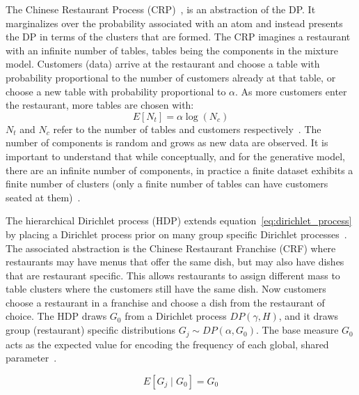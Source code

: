 The Chinese Restaurant Process (CRP)~\citep{neal2000markov, gershman2012tutorial}, is an abstraction of the DP. It marginalizes over the probability associated with an atom and instead presents the DP in terms of the clusters that are formed. The CRP imagines a restaurant with an infinite number of tables, tables being the components in the mixture model. Customers (data) arrive at the restaurant and choose a table with probability proportional to the number of customers already at that table, or choose a new table with probability proportional to $\alpha$. As more customers enter the restaurant, more tables are chosen with:
\begin{equation}
  E[N_t] = \alpha \log(N_c)
\end{equation}
$N_t$ and $N_c$ refer to the number of tables and customers respectively~\citep{gershman2012tutorial}. The number of components is random and grows as new data are observed. It is important to understand that while conceptually, and for the generative model, there are an infinite number of components, in practice a finite dataset exhibits a finite number of clusters (only a finite number of tables can have customers seated at them)~\citep{blei2006variational}.

The hierarchical Dirichlet process (HDP) extends equation~\ref{eq:dirichlet_process} by placing a Dirichlet process prior on many group specific Dirichlet processes~\citep{teh2005sharing}. The associated abstraction is the Chinese Restaurant Franchise (CRF) where restaurants may have menus that offer the same dish, but may also have dishes that are restaurant specific. This allows restaurants to assign different mass to table clusters where the customers still have the same dish. Now customers choose a restaurant in a franchise and choose a dish from the restaurant of choice. The HDP draws $G_0$ from a Dirichlet process $DP(\gamma, H)$, and it draws group (restaurant) specific distributions $G_j \sim DP(\alpha, G_0)$. The base measure $G_0$ acts as the expected value for encoding the frequency of each global, shared parameter~\citep{fox2007hierarchical}.

\begin{equation}
  E[G_j \mid G_0] = G_0
\end{equation}

